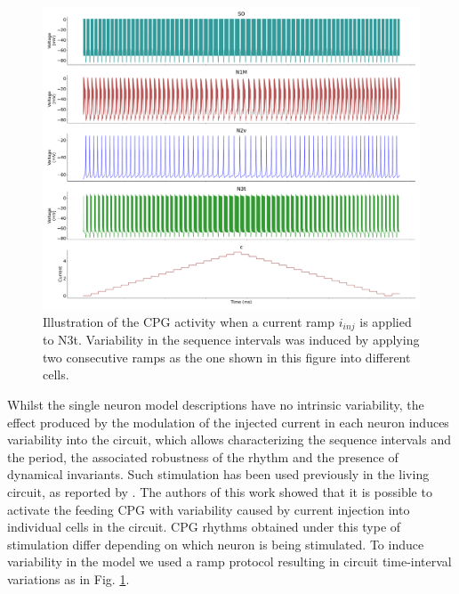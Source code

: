 \begin{figure}[hbt!]
	\centering
	\includegraphics[width=\textwidth]{img/methods-paper-modelo/circuit_w_current.pdf}
	\caption{Illustration of the CPG activity when a current ramp \(i_{inj}\) is applied to N3t. Variability in the sequence intervals was induced by applying two consecutive ramps as the one shown in this figure into different cells.  }
	\label{fig:complete ramp example}
\end{figure}

Whilst the single neuron model descriptions have no intrinsic variability, the effect produced by the modulation of the injected current in each neuron induces variability into the circuit, which allows characterizing the sequence intervals and the period, the associated robustness of the rhythm and the presence of dynamical invariants. Such stimulation has been used previously in the living circuit, as reported by \cite{Elliott1991}. The authors of this work showed that it is possible to activate the feeding CPG with variability caused by current injection into individual cells in the circuit. CPG rhythms obtained under this type of stimulation differ depending on which neuron is being stimulated. To induce variability in the model we used a ramp protocol resulting in circuit time-interval variations as in Fig. \ref{fig:complete ramp example}.



